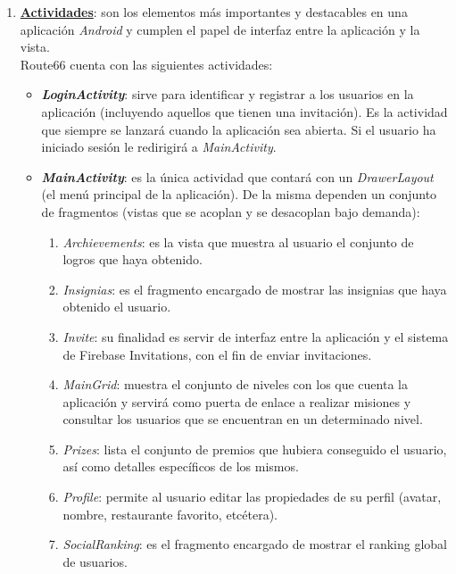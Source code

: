 \documentclass[twoside]{report}
\begin{document}
\begin{enumerate}
\item \textbf{\underline{Actividades}}: son los elementos más importantes y destacables en una aplicación \textit{Android} y cumplen el papel de interfaz entre la aplicación y la vista.\\
Route66 cuenta con las siguientes actividades:

	\begin{itemize}
	\item \textbf{\textit{LoginActivity}}: sirve para identificar y registrar a los usuarios en la aplicación (incluyendo aquellos que tienen una invitación). Es la actividad que siempre se lanzará cuando la aplicación sea abierta. Si el usuario ha iniciado sesión le redirigirá  a \textit{MainActivity}.
	
	\item \textbf{\textit{MainActivity}}: es la única actividad que contará con un \textit{DrawerLayout} (el menú principal de la aplicación). De la misma dependen un conjunto de fragmentos (vistas que se acoplan y se desacoplan bajo demanda):
	
		\begin{enumerate}
			\item \textit{Archievements}: es la vista que muestra al usuario el conjunto de logros que haya obtenido.
			
			\item \textit{Insignias}: es el fragmento encargado de mostrar las insignias que haya obtenido el usuario.
			
			\item \textit{Invite}: su finalidad es servir de interfaz entre la aplicación y el sistema de Firebase Invitations, con el fin de enviar invitaciones.
			
			\item \textit{MainGrid}: muestra el conjunto de niveles con los que cuenta la aplicación y servirá como puerta de enlace a realizar misiones y consultar los usuarios que se encuentran en un determinado nivel.
			
			\item \textit{Prizes}: lista el conjunto de premios que hubiera conseguido el usuario, así como detalles específicos de los mismos.
			
			\item \textit{Profile}: permite al usuario editar las propiedades de su perfil (avatar, nombre, restaurante favorito, etcétera).
			
			\item \textit{SocialRanking}: es el fragmento encargado de mostrar el ranking global de usuarios.
			

\end{enumerate}
\end{itemize}
\end{enumerate}
\end{document}
